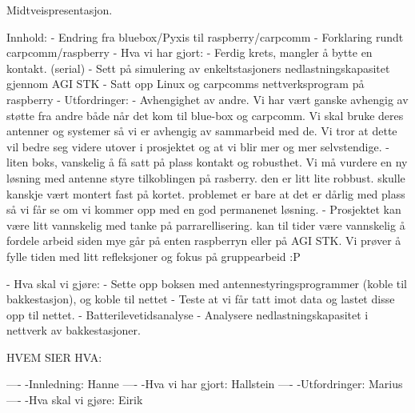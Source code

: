 Midtveispresentasjon.

Innhold:
- Endring fra bluebox/Pyxis til raspberry/carpcomm
- Forklaring rundt carpcomm/raspberry
- Hva vi har gjort:
	- Ferdig krets, mangler å bytte en kontakt. (serial)
	- Sett på simulering av enkeltstasjoners nedlastningskapasitet gjennom AGI STK
	- Satt opp Linux og carpcomms nettverksprogram på raspberry
- Utfordringer:
	- Avhengighet av andre.
		Vi har vært ganske avhengig av støtte fra andre både når det kom til blue-box og carpcomm. Vi skal bruke deres antenner og systemer så vi er avhengig av sammarbeid med de. Vi tror at dette vil bedre seg videre utover i prosjektet og at vi blir mer og mer selvstendige. 
	- liten boks, vanskelig å få satt på plass kontakt og robusthet. Vi må vurdere en ny løsning med antenne styre tilkoblingen på rasberry. den er litt lite robbust. skulle kanskje vært montert fast på kortet. problemet er bare at det er dårlig med plass så vi får se om vi kommer opp med en god permanenet løsning.
	- Prosjektet kan være litt vannskelig med tanke på parrarellisering. kan til tider være vannskelig å fordele arbeid siden mye går på enten raspberryn eller på AGI STK. Vi prøver å fylle tiden med litt refleksjoner og fokus på gruppearbeid :P 
	 



- Hva skal vi gjøre:
	- Sette opp boksen med antennestyringsprogrammer (koble til bakkestasjon), og koble til nettet
	- Teste at vi får tatt imot data og lastet disse opp til nettet.
	- Batterilevetidsanalyse
	- Analysere nedlastningskapasitet i nettverk av bakkestasjoner.

HVEM SIER HVA:

----
-Innledning: Hanne
----
-Hva vi har gjort: Hallstein
----
-Utfordringer: Marius
----
-Hva skal vi gjøre: Eirik